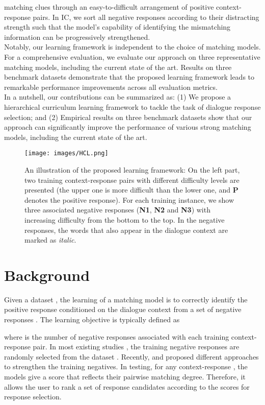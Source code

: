 \documentclass[11pt,a4paper]{article}
\begin{document}
matching clues through an easy-to-difficult arrangement of positive context-response pairs. In IC, we sort all negative responses according to their distracting strength such that the model’s capability of identifying the mismatching information can be progressively strengthened. \\\indent Notably, our learning framework is independent to the choice of matching models. For a comprehensive evaluation, we evaluate our approach on three representative matching models, including the current state of the art.
Results on three benchmark datasets demonstrate that the proposed learning framework leads to remarkable performance improvements across all evaluation metrics. \\\indent
In a nutshell, our contributions can be summarized as:
(1) We propose a hierarchical curriculum learning framework to tackle the task of dialogue response selection; and (2) Empirical results on three benchmark datasets show that our approach can significantly improve the performance of various strong matching models, including the current state of the art.


\begin{figure*}[t] 
	\centering    
	\setlength{\abovecaptionskip}{3pt}
\texttt{[image: images/HCL.png]}
	\caption{An illustration of the proposed learning framework: On the left part, two training context-response pairs with different difficulty levels are presented (the upper one is more difficult than the lower one, and \textbf{P} denotes the positive response). For each training instance, we show three associated negative responses (\textbf{N1}, \textbf{N2} and \textbf{N3}) with increasing difficulty from the bottom to the top. In the negative responses, the words that also appear in the dialogue context are marked as \textit{italic}.}
\label{fig:overview_diagram}
\end{figure*}




\section{Background}
Given a dataset , the learning of a matching model  is to correctly identify the positive response  conditioned on the dialogue context  from a set of negative responses . The learning objective is typically defined as 

where  is the number of negative responses associated with each training context-response pair. In most existing studies  \cite{DBLP:conf/acl/WuWXZL17,DBLP:conf/acl/WuLCZDYZL18,DBLP:conf/cikm/GuLL19}, the training negative responses  are randomly selected from the dataset . Recently, \citet{li-etal-2019-sampling} and \citet{lin2020world} proposed different approaches to strengthen the training negatives. In testing, for any context-response , the models give a score  that reflects their pairwise matching degree. Therefore, it allows the user to rank a set of response candidates according to the scores for response selection.
\end{document}
